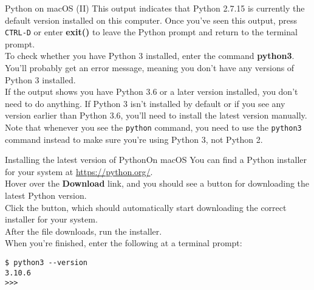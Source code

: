 \documentclass[aspectratio=169]{beamer}
\begin{document}
\begin{frame}[fragile]{Python on macOS (II)}
    This output indicates that Python 2.7.15 is currently the default version installed on this computer.
    Once you've seen this output, press \texttt{CTRL-D} or enter \textbf{exit()} to leave the Python prompt and return to the terminal prompt. \\
    \vspace{10pt}
    To check whether you have Python 3 installed, enter the command \textbf{python3}.
    You'll probably get an error message, meaning you don't have any versions of Python 3 installed. \\
    \vspace{10pt}
    If the output shows you have Python 3.6 or a later version installed, you don't need to do anything.
    If Python 3 isn't installed by default or if you see any version earlier than Python 3.6, you'll need to install the latest version manually. \\
    \vspace{10pt}
    Note that whenever you see the \texttt{python} command, you need to use the \texttt{python3} command instead to make sure you're using Python 3, not Python 2.
\end{frame}


\begin{frame}[fragile]{Installing the latest version of Python}{On macOS}
    You can find a Python installer for your system at \href{https://python.org/}{https://python.org/}. \\
    \vspace{10pt}
    Hover over the \textbf{Download} link, and you should see a button for downloading the latest Python version. \\
    \vspace{10pt}
    Click the button, which should automatically start downloading the correct installer for your system. \\
    \vspace{10pt}
    After the file downloads, run the installer. \\
    \vspace{10pt}
    When you're finished, enter the following at a terminal prompt:
    \vspace{10pt}
    \begin{Verbatim}[fontsize=\footnotesize]
$ python3 --version
3.10.6
>>>
    \end{Verbatim}
\end{frame}
\end{document}
